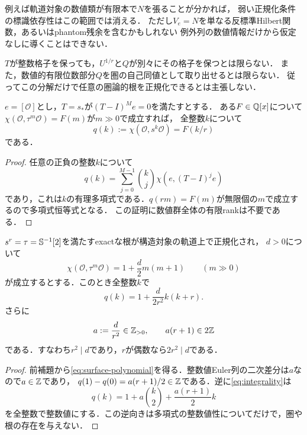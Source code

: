 \documentclass[11pt,a4paper]{ltjsarticle}
\begin{document}
\begin{remark}
例えば軌道対象の数値類が有限本で$N$を張ることが分かれば，
弱い正規化条件の標識依存性はこの範囲では消える．
ただし$V_e=N$を単なる反標準Hilbert関数，あるいはphantom残余を含むかもしれない
例外列の数値情報だけから仮定なしに導くことはできない．
\end{remark}


$T$が整数格子を保っても，$U^{1/r}$と$Q$が別々にその格子を保つとは限らない．
また，数値的有限位数部分$Q$を圏の自己同値として取り出せるとは限らない．
従ってこの分解だけで任意の圏論的根を正規化できるとは主張しない．

\begin{lemma}[軌道上の多項式性]\label{lem:polynomial}
$e=[\mathcal O]$とし，$T=s_*$が$(T-I)^Me=0$を満たすとする．
ある$F\in\mathbb Q[x]$について$\chi(\mathcal O,\tau^m\mathcal O)=F(m)$が$m\gg0$で成立すれば，
全整数$k$について
\[
 q(k):=\chi(\mathcal O,s^k\mathcal O)=F(k/r)
\]
である．
\end{lemma}
\begin{proof}
任意の正負の整数$k$について
\[
 q(k)=\sum_{j=0}^{M-1}\binom{k}{j}\chi(e,(T-I)^je)
\]
であり，これは$k$の有理多項式である．$q(rm)=F(m)$が無限個の$m$で成立するので多項式恒等式となる．
この証明に数値群全体の有限rankは不要である．
\end{proof}

\begin{theorem}[曲面指数の整除条件]\label{thm:divisibility}
$s^r=\tau=\mathbb S^{-1}[2]$を満たすexactな根が構造対象の軌道上で正規化され，
$d>0$について
\begin{equation}\label{eq:ac-euler}
 \chi(\mathcal O,\tau^m\mathcal O)=1+\frac d2m(m+1)\qquad(m\gg0)
\end{equation}
が成立するとする．このとき全整数$k$で
\begin{equation}\label{eq:surface-polynomial}
 q(k)=1+\frac{d}{2r^2}k(k+r).
\end{equation}
さらに
\begin{equation}\label{eq:integrality}
 a:=\frac d{r^2}\in\mathbb Z_{>0},\qquad a(r+1)\in2\mathbb Z
\end{equation}
である．すなわち$r^2\mid d$であり，$r$が偶数なら$2r^2\mid d$である．
\end{theorem}
\begin{proof}
前補題から\eqref{eq:surface-polynomial}を得る．整数値Euler列の二次差分は$a$なので$a\in\mathbb Z$であり，
$q(1)-q(0)=a(r+1)/2\in\mathbb Z$である．逆に\eqref{eq:integrality}は
\[
 q(k)=1+a\binom{k}{2}+\frac{a(r+1)}2k
\]
を全整数で整数値にする．この逆向きは多項式の整数値性についてだけで，圏や根の存在を与えない．
\end{proof}
\end{document}
